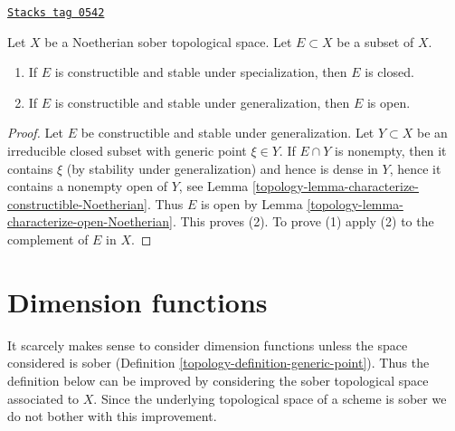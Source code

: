 \begin{lemma}
\label{topology-lemma-characterize-closed-Noetherian}
\href{https://stacks.math.columbia.edu/tag/0542}{\texttt{Stacks tag 0542}}

Let $X$ be a Noetherian sober topological space.
Let $E \subset X$ be a subset of $X$.
\begin{enumerate}
\item If $E$ is constructible and stable under specialization, then
$E$ is closed.
\item If $E$ is constructible and stable under generalization, then
$E$ is open.
\end{enumerate}
\end{lemma}

\begin{proof}

Let $E$ be constructible and stable under generalization.
Let $Y \subset X$ be an irreducible closed subset with generic point
$\xi \in Y$. If $E \cap Y$ is nonempty, then it contains $\xi$ (by
stability under generalization) and hence is dense in $Y$, hence it
contains a nonempty open of $Y$, see
Lemma \ref{topology-lemma-characterize-constructible-Noetherian}.
Thus $E$ is open by
Lemma \ref{topology-lemma-characterize-open-Noetherian}.
This proves (2). To prove (1) apply (2) to the complement of $E$ in $X$.
\end{proof}

\section{Dimension functions}
\label{topology-section-dimension-function}
It scarcely makes sense to consider dimension functions unless the space
considered is sober (Definition \ref{topology-definition-generic-point}). Thus the
definition below can be improved by considering the sober topological space
associated to $X$. Since the underlying topological space of a scheme
is sober we do not bother with this improvement.

